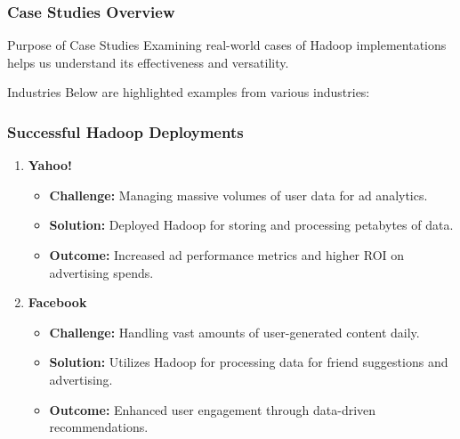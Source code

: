 \documentclass[aspectratio=169]{beamer}
\begin{document}
\begin{frame}[fragile]
  \frametitle{Case Studies Overview}
  \begin{block}{Purpose of Case Studies}
    Examining real-world cases of Hadoop implementations helps us understand its effectiveness and versatility.
  \end{block}
  \begin{block}{Industries}
    Below are highlighted examples from various industries:
  \end{block}
\end{frame}

\begin{frame}[fragile]
  \frametitle{Successful Hadoop Deployments}
  \begin{enumerate}
    \item \textbf{Yahoo!}
      \begin{itemize}
        \item \textbf{Challenge:} Managing massive volumes of user data for ad analytics.
        \item \textbf{Solution:} Deployed Hadoop for storing and processing petabytes of data.
        \item \textbf{Outcome:} Increased ad performance metrics and higher ROI on advertising spends.
      \end{itemize}
    
    \item \textbf{Facebook}
      \begin{itemize}
        \item \textbf{Challenge:} Handling vast amounts of user-generated content daily.
        \item \textbf{Solution:} Utilizes Hadoop for processing data for friend suggestions and advertising.
        \item \textbf{Outcome:} Enhanced user engagement through data-driven recommendations.
      \end{itemize}
  \end{enumerate}
\end{frame}
\end{document}
